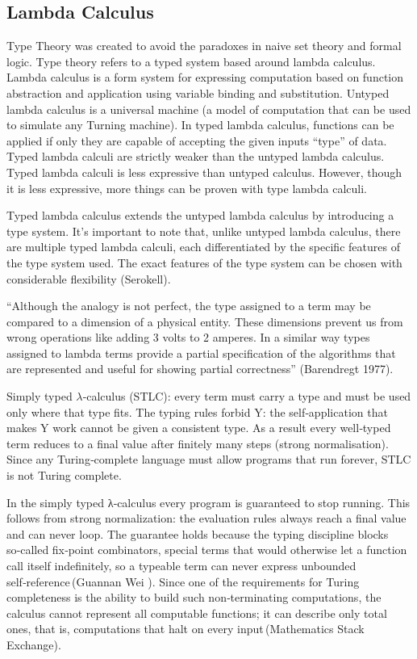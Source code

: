 \documentclass{article}
\newcommand{\1}{\mathbbm{1}}
\theoremstyle{plain}
\theoremstyle{definition}
\numberwithin{equation}{section}
\begin{document}
\subsection{Lambda Calculus}

Type Theory was created to avoid the paradoxes in naive set theory and formal logic. Type theory refers to a typed system based around lambda calculus. Lambda calculus is a form system for expressing computation based on function abstraction and application using variable binding and substitution. Untyped lambda calculus is a universal machine (a model of computation that can be used to simulate any Turning machine). In typed lambda calculus, functions can be applied if only they are capable of accepting the given inputs “type” of data. Typed lambda calculi are strictly weaker than the untyped lambda calculus.  Typed lambda calculi is less expressive than untyped calculus. However, though it is less expressive, more things can be proven with type lambda calculi. 

Typed lambda calculus extends the untyped lambda calculus by introducing a type system. It’s important to note that, unlike untyped lambda calculus, there are multiple typed lambda calculi, each differentiated by the specific features of the type system used. The exact features of the type system can be chosen with considerable flexibility (Serokell).  

“Although the analogy is not perfect, the type assigned to a term may be compared to a dimension of a physical entity. These dimensions prevent us from wrong operations like adding 3 volts to 2 amperes. In a similar way types assigned to lambda terms provide a partial specification of the algorithms that are represented and useful for showing partial correctness” (Barendregt 1977). 

Simply typed $\lambda$‑calculus (STLC): every term must carry a type and must be used only where that type fits. The typing rules forbid Y: the self‑application that makes Y work cannot be given a consistent type. As a result every well‑typed term reduces to a final value after finitely many steps (strong normalisation). Since any Turing‑complete language must allow programs that run forever, STLC is not Turing complete.

In the simply typed λ‑calculus every program is guaranteed to stop running. This follows from strong normalization: the evaluation rules always reach a final value and can never loop. The guarantee holds because the typing discipline blocks so‑called fix‑point combinators, special terms that would otherwise let a function call itself indefinitely, so a typeable term can never express unbounded self‑reference (Guannan Wei ). Since one of the requirements for Turing completeness is the ability to build such non‑terminating computations, the calculus cannot represent all computable functions; it can describe only total ones, that is, computations that halt on every input (Mathematics Stack Exchange).
\end{document}
